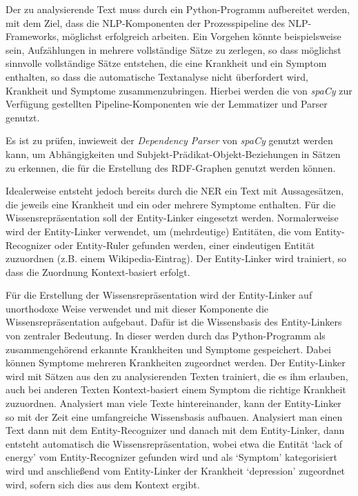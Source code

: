 Der zu analysierende Text muss durch ein Python-Programm aufbereitet werden, mit dem Ziel, dass die NLP-Komponenten der Prozesspipeline des NLP-Frameworks, möglichst erfolgreich arbeiten. Ein Vorgehen könnte beispielsweise sein, Aufzählungen in mehrere vollständige Sätze zu zerlegen, so dass möglichst sinnvolle vollständige Sätze entstehen, die eine Krankheit und ein Symptom enthalten, so dass die automatische Textanalyse nicht überfordert wird, Krankheit und Symptome zusammenzubringen. Hierbei werden die von \emph{spaCy} zur Verfügung gestellten Pipeline-Komponenten wie der Lemmatizer und Parser genutzt.

Es ist zu prüfen, inwieweit der \emph{Dependency Parser} von \emph{spaCy} genutzt werden kann, um Abhängigkeiten und Subjekt-Prädikat-Objekt-Beziehungen in Sätzen zu erkennen, die für die Erstellung des RDF-Graphen genutzt werden können.

Idealerweise entsteht jedoch bereits durch die NER ein Text mit Aussagesätzen, die jeweils eine Krankheit und ein oder mehrere Symptome enthalten. Für die Wissensrepräsentation soll der Entity-Linker eingesetzt werden. Normalerweise wird der Entity-Linker verwendet, um (mehrdeutige) Entitäten, die vom Entity-Recognizer oder Entity-Ruler gefunden werden, einer eindeutigen Entität zuzuordnen (z.B. einem Wikipedia-Eintrag). Der Entity-Linker wird trainiert, so dass die Zuordnung Kontext-basiert erfolgt.

Für die Erstellung der Wissensrepräsentation wird der Entity-Linker auf unorthodoxe Weise verwendet und mit dieser Komponente die Wissensrepräsentation aufgebaut. Dafür ist die Wissensbasis des Entity-Linkers von zentraler Bedeutung. In dieser werden durch das Python-Programm als zusammengehörend erkannte Krankheiten und Symptome gespeichert. Dabei können Symptome mehreren Krankheiten zugeordnet werden. Der Entity-Linker wird mit Sätzen aus den zu analysierenden Texten trainiert, die es ihm erlauben, auch bei anderen Texten Kontext-basiert einem Symptom die richtige Krankheit zuzuordnen. Analysiert man viele Texte hintereinander, kann der Entity-Linker so mit der Zeit eine umfangreiche Wissensbasis aufbauen. Analysiert man einen Text dann mit dem Entity-Recognizer und danach mit dem Entity-Linker, dann entsteht automatisch die Wissensrepräsentation, wobei etwa die Entität `lack of energy' vom Entity-Recognizer gefunden wird und als `Symptom' kategorisiert wird und anschließend vom Entity-Linker der Krankheit `depression' zugeordnet wird, sofern sich dies aus dem Kontext ergibt.

